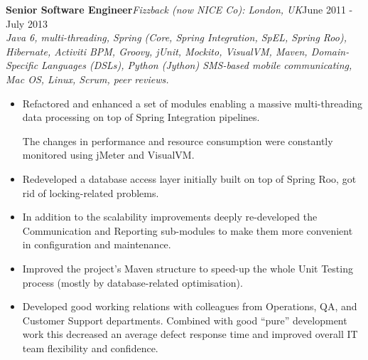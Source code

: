 \documentclass{res}
\newcommand{\jobdes}[4]{\needspace{3\baselineskip} %
{\noindent \bf #3\hspace{2ex}}{{\em \small #1}}{\hfill #2}\\{{\it \small #4.}}}
\newif\ifFullVersion
\begin{document}
\begin{resume}
\jobdes{Fizzback (now NICE Co): London, UK} {June 2011 - July 2013}{Senior Software Engineer}
{Java 6, multi-threading, Spring (Core, Spring Integration, SpEL, Spring Roo), Hibernate, Activiti BPM, Groovy, jUnit, Mockito, VisualVM, Maven, Domain-Specific Languages (DSLs), Python (Jython) SMS-based mobile communicating, Mac OS, Linux, Scrum, peer reviews}
\begin{itemize} \itemsep -2pt %
 \item Refactored and enhanced a set of modules enabling a massive multi-threading data processing on top of Spring Integration pipelines.
\ifFullVersion
While for some modules it was enough to re-code the critical pieces with the standard “stateless or immutable” approach, the main part of existed system required deep re-design based on Enterprise Integration Patterns (EIP) messaging-based architecture and extensive use of Java multi-threading tools.
\fi
The changes in performance and resource consumption were constantly monitored using jMeter and VisualVM.
 \item Redeveloped a database access layer initially built on top of Spring Roo, got rid of locking-related problems.
\ifFullVersion
Some modules were completely re-built until the required level of performance and reliability was achieved.
\fi
 \item In addition to the scalability improvements deeply re-developed the Communication and Reporting sub-modules to make them more convenient in configuration and maintenance.
\ifFullVersion
   These changes (like introducing ad-hoc configuration DSL and flexible report templates) greatly improved overall system's maintainability and customer provisioning time.
\fi
 \item 	Improved the project’s Maven structure to speed-up the whole Unit Testing process (mostly by database-related optimisation).
\ifFullVersion
Initiated use of CI service (Jenkins) as a key component of the team’s Scrum Agile methodology approach.
\fi
 \item Developed good working relations with colleagues from Operations, QA, and Customer Support departments. Combined with good ``pure'' development work this decreased an average defect response time and improved overall IT team flexibility and confidence.
\end{itemize}


\end{resume}
\end{document}
